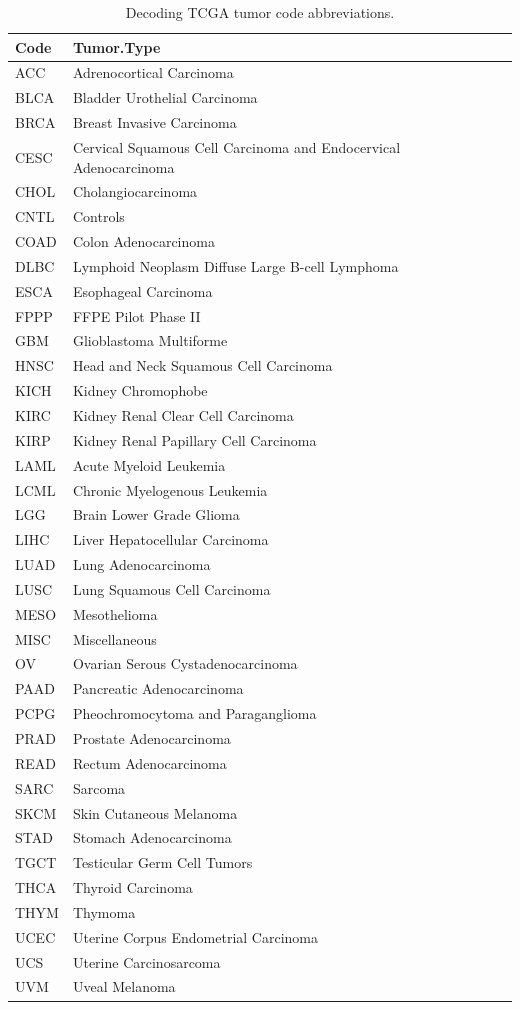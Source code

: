 \begin{table}

\caption{\label{tab:tab-deco}Decoding TCGA tumor code abbreviations.}
\centering
\begin{tabular}[t]{ll}
\toprule
Code & Tumor.Type\\
\midrule
ACC & Adrenocortical Carcinoma\\
BLCA & Bladder Urothelial Carcinoma\\
BRCA & Breast Invasive Carcinoma\\
CESC & Cervical Squamous Cell Carcinoma and Endocervical Adenocarcinoma\\
CHOL & Cholangiocarcinoma\\
\addlinespace
CNTL & Controls\\
COAD & Colon Adenocarcinoma\\
DLBC & Lymphoid Neoplasm Diffuse Large B-cell Lymphoma\\
ESCA & Esophageal Carcinoma\\
FPPP & FFPE Pilot Phase II\\
\addlinespace
GBM & Glioblastoma Multiforme\\
HNSC & Head and Neck Squamous Cell Carcinoma\\
KICH & Kidney Chromophobe\\
KIRC & Kidney Renal Clear Cell Carcinoma\\
KIRP & Kidney Renal Papillary Cell Carcinoma\\
\addlinespace
LAML & Acute Myeloid Leukemia\\
LCML & Chronic Myelogenous Leukemia\\
LGG & Brain Lower Grade Glioma\\
LIHC & Liver Hepatocellular Carcinoma\\
LUAD & Lung Adenocarcinoma\\
\addlinespace
LUSC & Lung Squamous Cell Carcinoma\\
MESO & Mesothelioma\\
MISC & Miscellaneous\\
OV & Ovarian Serous Cystadenocarcinoma\\
PAAD & Pancreatic Adenocarcinoma\\
\addlinespace
PCPG & Pheochromocytoma and Paraganglioma\\
PRAD & Prostate Adenocarcinoma\\
READ & Rectum Adenocarcinoma\\
SARC & Sarcoma\\
SKCM & Skin Cutaneous Melanoma\\
\addlinespace
STAD & Stomach Adenocarcinoma\\
TGCT & Testicular Germ Cell Tumors\\
THCA & Thyroid Carcinoma\\
THYM & Thymoma\\
UCEC & Uterine Corpus Endometrial Carcinoma\\
\addlinespace
UCS & Uterine Carcinosarcoma\\
UVM & Uveal Melanoma\\
\bottomrule
\end{tabular}
\end{table}

